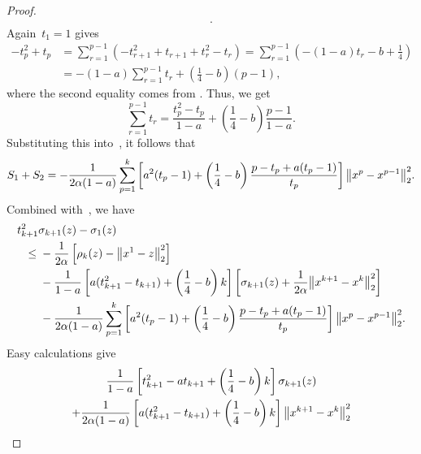 \documentclass[../main]{subfiles}
\begin{document}
\begin{proof}
\begin{multline}
        .\end{multline}
    Again~$t_1 = 1$ gives
    \begin{align}
        - t_p^2 + t_p & = \sum_{r = 1}^{p - 1} ( - t_{r + 1}^2 + t_{r + 1} + t_r^2 - t_r ) = \sum_{r = 1}^{p - 1} \left(- (1 - a) t_r - b + \frac{1}{4} \right) \\
                      & = - (1 - a) \sum_{r = 1}^{p - 1} t_r + \left( \frac{1}{4} - b \right) (p - 1)
        ,\end{align}
    where the second equality comes from .
    Thus, we get
    \begin{equation} \label{eq:sum t}
        \sum_{r = 1}^{p - 1} t_r = \frac{t_p^2 - t_p}{1 - a} + \left( \frac{1}{4} - b \right) \frac{p - 1}{1 - a}
        .\end{equation}
    Substituting this into~, it follows that
    \begin{multline}
        S_1 + S_2 = - \frac{1}{2 \alpha (1 - a)} \sum_{p = 1}^{k} \left[ a^2 (t_p - 1) + \left( \frac{1}{4} - b \right) \frac{p - t_p + a (t_p - 1)}{t_p} \right] \norm*{x^p - x^{p - 1}}_2^2
        .\end{multline}
    Combined with~, we have
    \begin{align}
        \MoveEqLeft t_{k + 1}^2 \sigma_{k + 1}(z) - \sigma_1(z)                                                                                                                                   \\
        \le{} & - \frac{1}{2 \alpha} \left[ \rho_k(z) - \norm*{x^1 - z}_2^2 \right]                                                                                                               \\
              & - \frac{1}{1 - a} \left[ a (t_{k + 1}^2 - t_{k + 1}) + \left( \frac{1}{4} - b \right) k \right] \left[ \sigma_{k + 1}(z) + \frac{1}{2 \alpha} \norm*{x^{k + 1} - x^k}_2^2 \right] \\
              & - \frac{1}{2 \alpha (1 - a)} \sum_{p = 1}^{k} \left[ a^2 (t_p - 1) + \left( \frac{1}{4} - b \right) \frac{p - t_p + a (t_p - 1)}{t_p} \right] \norm*{x^p - x^{p - 1}}_2^2
        .\end{align}
    Easy calculations give
    \begin{multline}
        \frac{1}{1 - a} \left[ t_{k + 1}^2 - a t_{k + 1} + \left( \frac{1}{4} - b \right) k \right] \sigma_{k + 1}(z) \\
        + \frac{1}{2 \alpha (1 - a)} \left[ a (t_{k + 1}^2 - t_{k + 1}) + \left( \frac{1}{4} - b \right) k \right] \norm*{x^{k + 1} - x^k}_2^2 \\

\end{multline}
\end{proof}
\end{document}
